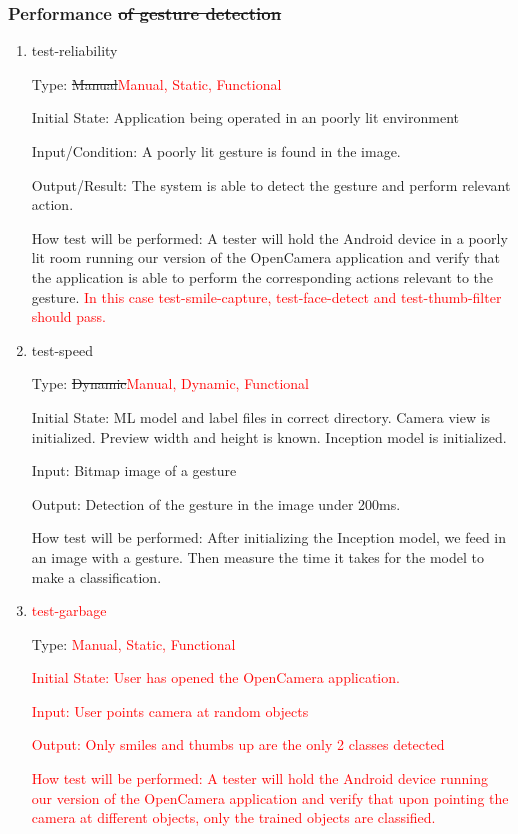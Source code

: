 \documentclass[12pt, titlepage]{article}
\begin{document}
\subsubsection{Performance \sout{of gesture detection}}

\begin{enumerate}

\item{test-reliability\\}

Type: \sout{Manual}\textcolor{red}{Manual, Static, Functional}
					
Initial State: Application being operated in an poorly lit environment
				
Input/Condition: A poorly lit gesture is found in the image.
					
Output/Result: The system is able to detect the gesture and perform relevant action.
					
How test will be performed: A tester will hold the Android device in a poorly lit room running our version of the OpenCamera application and verify that the application is able to perform the corresponding actions relevant to the gesture. \textcolor{red}{In this case test-smile-capture, test-face-detect and test-thumb-filter should pass.}
					
\item{test-speed\\}

Type: \sout{Dynamic}\textcolor{red}{Manual, Dynamic, Functional}
					
Initial State: ML model and label files in correct directory. Camera view is initialized. Preview width and height is known. Inception model is initialized. 
					
Input: Bitmap image of a gesture
					
Output: Detection of the gesture in the image under 200ms.
					
How test will be performed: After initializing the Inception model, we feed in an image with a gesture. Then measure the time it takes for the model to make a classification.

\item{\textcolor{red}{ test-garbage}\\}

Type: \textcolor{red}{Manual, Static, Functional}
					
\textcolor{red}{Initial State: 
    User has opened the OpenCamera application.}
					
\textcolor{red}{Input: User points camera at random objects}
					
\textcolor{red}{Output: Only smiles and thumbs up are the only 2 classes detected }
					
\textcolor{red}{How test will be performed: A tester will hold the Android device running our version of the OpenCamera application and verify that upon pointing the camera at different objects, only the trained objects are classified.}

\end{enumerate}
\end{document}
